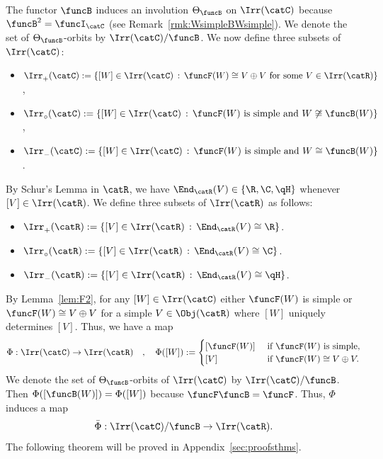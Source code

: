 \documentclass[12pt]{amsart}
\begin{document}
The functor $\funcB$ induces an involution $\Theta_\funcB$ on $\Irr(\catC)$ because $\funcB^2=\funcI_\catC$ (see Remark~\ref{rmk:WsimpleBWsimple}). We denote the set of $\Theta_\funcB$-orbits by $\Irr(\catC)/\funcB$. 
We now define three subsets of $\Irr(\catC)$:
\begin{itemize}
\item $\Irr_+^{}(\catC):=\left\{[W]\in\Irr(\catC)
\,:\,\funcF(W)\cong V\oplus V\text{ for some }V\in\Irr(\catR) \right\}$,
\item
$\Irr_\circ^{}(\catC):=\left\{[W]\in\Irr(\catC)\,:\,\funcF(W)\text{ is simple and }W\not\cong\funcB(W)\right\}$,
\item
$\Irr_-^{}(\catC):=\left\{[W]\in\Irr(\catC)\,:\,\funcF(W)\text{ is simple and }W\cong\funcB(W)\right\}$.


\end{itemize}
By Schur's Lemma in $\catR$, we have $\End_\catR(V)\in\{\R,\C,\qH\}$ whenever $[V]\in \Irr(\catR)$. We define three subsets of $\Irr(\catR)$ 
as follows: 
\begin{itemize}
\item $\Irr_+^{}(\catR):=\left\{
[V]\in\Irr(\catR)\,:\,
\End_\catR(V)\cong\R\right\}$.

\item $\Irr_\circ^{}(\catR):=\left\{
[V]\in\Irr(\catR)\,:\,
\End_\catR(V)
\cong \C\right\}$.


\item $\Irr_-^{}(\catR):=\left\{
[V]\in\Irr(\catR)\,:\,
\End_\catR(V)\cong \qH\right\}$.

\end{itemize}
By Lemma~\ref{lem:F2}, for any $[W]\in\Irr(\catC)$ either $\funcF(W)$ is simple or $\funcF(W)\cong V\oplus V$ for a simple $V\in\Obj(\catR)$ where $[W]$ uniquely determines $[V]$. 
Thus, we have a map
\begin{equation}
\label{eq:themapPhi}
\Phi:\Irr(\catC)\to\Irr(\catR)
\quad,\quad
\Phi([W]):=
\begin{cases}
[\funcF(W)]&\text{ if }\funcF(W)\text{ is simple},\\
[V]&\text{ if }\funcF(W)\cong V\oplus V.
\end{cases}
\end{equation}
We denote the set of $\Theta_\funcB$-orbits of $\Irr(\catC)$ by $\Irr(\catC)/\funcB$.
Then $\Phi([\funcB(W)])=\Phi([W])$ because
$\funcF\funcB=\funcF$. Thus,
 $\Phi$ 
 induces a map \[
 \bar \Phi:\Irr(\catC)/\funcB\to \Irr(\catR).
 \] 
The following theorem will be proved in Appendix~\ref{sec:proofsthms}.
\end{document}
